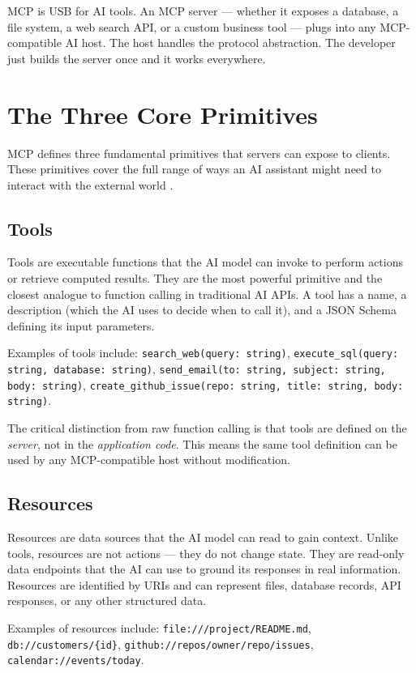 MCP is USB for AI tools. An MCP server — whether it exposes a database, a file system, a web search API, or a custom business tool — plugs into any MCP-compatible AI host. The host handles the protocol abstraction. The developer just builds the server once and it works everywhere.

\section{The Three Core Primitives}
MCP defines three fundamental primitives that servers can expose to clients. These primitives cover the full range of ways an AI assistant might need to interact with the external world \cite{anthropic2024mcp}.

\subsection{Tools}
Tools are executable functions that the AI model can invoke to perform actions or retrieve computed results. They are the most powerful primitive and the closest analogue to function calling in traditional AI APIs. A tool has a name, a description (which the AI uses to decide when to call it), and a JSON Schema defining its input parameters.

Examples of tools include: \texttt{search\_web(query: string)}, \texttt{execute\_sql(query: string, database: string)}, \texttt{send\_email(to: string, subject: string, body: string)}, \texttt{create\_github\_issue(repo: string, title: string, body: string)}.

The critical distinction from raw function calling is that tools are defined on the \textit{server}, not in the \textit{application code}. This means the same tool definition can be used by any MCP-compatible host without modification.

\subsection{Resources}
Resources are data sources that the AI model can read to gain context. Unlike tools, resources are not actions — they do not change state. They are read-only data endpoints that the AI can use to ground its responses in real information. Resources are identified by URIs and can represent files, database records, API responses, or any other structured data.

Examples of resources include: \texttt{file:///project/README.md}, \texttt{db://customers/\{id\}}, \texttt{github://repos/owner/repo/issues}, \texttt{calendar://events/today}.

